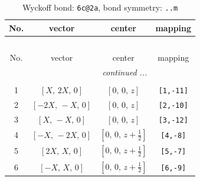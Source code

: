 \documentclass[fleqn,8pt]{jsarticle}
\begin{document}
\begin{longtable}{cccc}
\caption{Wyckoff bond: {\tt 6c@2a}, bond symmetry: {\tt ..m}}
 \\
 \hline \hline
No. & vector & center & mapping \\ \hline \endfirsthead

\multicolumn{3}{l}{\tablename\ \thetable{}} \\
 \hline \hline
No. & vector & center & mapping \\ \hline \endhead

 \hline \hline
\multicolumn{3}{r}{\footnotesize\it continued ...} \\ \endfoot

 \hline \hline
\multicolumn{3}{r}{} \\ \endlastfoot

1 & $\left[ X,\, 2 X,\, 0 \right]$ & $\left[ 0,\, 0,\, z \right]$ & {\tt [1,-11]} \\ \hline
2 & $\left[ - 2 X,\, - X,\, 0 \right]$ & $\left[ 0,\, 0,\, z \right]$ & {\tt [2,-10]} \\ \hline
3 & $\left[ X,\, - X,\, 0 \right]$ & $\left[ 0,\, 0,\, z \right]$ & {\tt [3,-12]} \\ \hline
4 & $\left[ - X,\, - 2 X,\, 0 \right]$ & $\left[ 0,\, 0,\, z + \frac{1}{2} \right]$ & {\tt [4,-8]} \\ \hline
5 & $\left[ 2 X,\, X,\, 0 \right]$ & $\left[ 0,\, 0,\, z + \frac{1}{2} \right]$ & {\tt [5,-7]} \\ \hline
6 & $\left[ - X,\, X,\, 0 \right]$ & $\left[ 0,\, 0,\, z + \frac{1}{2} \right]$ & {\tt [6,-9]} \\
\end{longtable}
\renewcommand{\arraystretch}{1.2}
\end{document}
